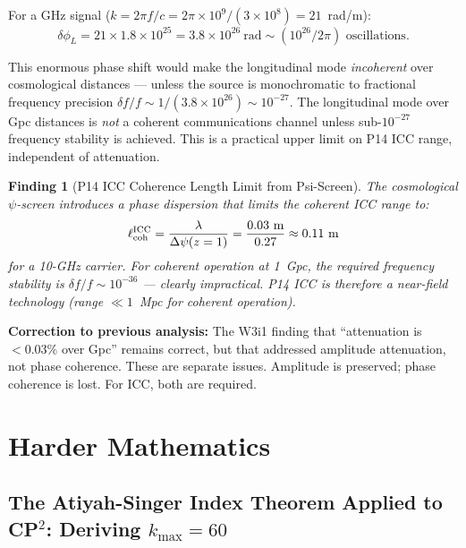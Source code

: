 \documentclass[11pt]{article}
\newtheorem{finding}{Finding}[section]
\theoremstyle{definition}
\theoremstyle{remark}
\newcommand{\ee}[1]{\times 10^{#1}}
\begin{document}
For a GHz signal ($k = 2\pi f/c = 2\pi \times 10^9/(3\ee{8}) = 21$~rad/m):
\begin{equation}
\delta\phi_L = 21 \times 1.8\ee{25} = 3.8\ee{26}~\text{rad} \sim
(10^{26}/2\pi) \text{ oscillations}.
\end{equation}

This enormous phase shift would make the longitudinal mode
\emph{incoherent} over cosmological distances --- unless the source is
monochromatic to fractional frequency precision $\delta f/f \sim
1/(3.8\ee{26}) \sim 10^{-27}$. The longitudinal mode over Gpc distances
is \emph{not} a coherent communications channel unless sub-$10^{-27}$
frequency stability is achieved. This is a practical upper limit on P14
ICC range, independent of attenuation.

\begin{finding}[P14 ICC Coherence Length Limit from Psi-Screen]
The cosmological $\psi$-screen introduces a phase dispersion that
limits the coherent ICC range to:
\begin{equation}
\ell_{\rm coh}^{\rm ICC} = \frac{\lambda}{\Delta\psi(z=1)}
= \frac{0.03~\text{m}}{0.27} \approx 0.11~\text{m}
\end{equation}
for a 10-GHz carrier. For coherent operation at 1~Gpc, the required
frequency stability is $\delta f/f \sim 10^{-36}$ --- clearly
impractical. P14 ICC is therefore a near-field technology (range
$\ll 1$~Mpc for coherent operation).
\end{finding}

\textbf{Correction to previous analysis:} The W3i1 finding that ``attenuation
is $< 0.03\%$ over Gpc'' remains correct, but that addressed amplitude
attenuation, not phase coherence. These are separate issues. Amplitude is
preserved; phase coherence is lost. For ICC, both are required.

\section{Harder Mathematics}
\label{sec:math}

\subsection{The Atiyah-Singer Index Theorem Applied to CP$^2$: Deriving $k_{\max} = 60$}
\label{sec:index-theorem}
\end{document}
